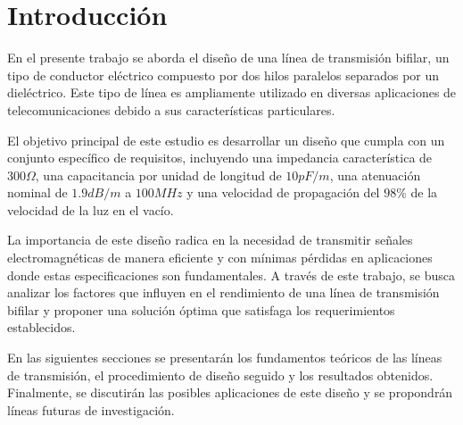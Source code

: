 \section{Introducción}

En el presente trabajo se aborda el diseño de una línea de transmisión bifilar, un tipo de conductor eléctrico compuesto por dos hilos paralelos separados por un dieléctrico. Este tipo de línea es ampliamente utilizado en diversas aplicaciones de telecomunicaciones debido a sus características particulares.

El objetivo principal de este estudio es desarrollar un diseño que cumpla con un conjunto específico de requisitos, incluyendo una impedancia característica de $300 \Omega$, una capacitancia por unidad de longitud de $10 pF/m$, una atenuación nominal de $1.9 dB/m$ a $100 MHz$ y una velocidad de propagación del $98 \%$ de la velocidad de la luz en el vacío.

La importancia de este diseño radica en la necesidad de transmitir señales electromagnéticas de manera eficiente y con mínimas pérdidas en aplicaciones donde estas especificaciones son fundamentales. A través de este trabajo, se busca analizar los factores que influyen en el rendimiento de una línea de transmisión bifilar y proponer una solución óptima que satisfaga los requerimientos establecidos.

En las siguientes secciones se presentarán los fundamentos teóricos de las líneas de transmisión, el procedimiento de diseño seguido y los resultados obtenidos. Finalmente, se discutirán las posibles aplicaciones de este diseño y se propondrán líneas futuras de investigación.


\pagebreak